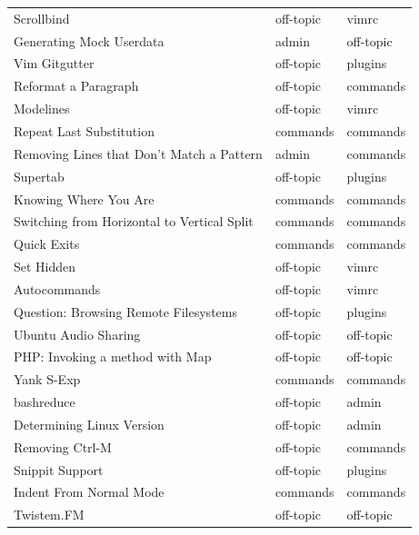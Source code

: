 \documentclass[12pt, a4paper]{article}
\begin{document}
\begin{longtable}{lll}
 Scrollbind                                  & off-topic   & vimrc     \\
 Generating Mock Userdata                    & admin       & off-topic \\
 Vim Gitgutter                               & off-topic   & plugins   \\
 Reformat a Paragraph                        & off-topic   & commands  \\
 Modelines                                   & off-topic   & vimrc     \\
 Repeat Last Substitution                    & commands    & commands  \\
 Removing Lines that Don't Match a Pattern   & admin       & commands  \\
 Supertab                                    & off-topic   & plugins   \\
 Knowing Where You Are                       & commands    & commands  \\
 Switching from Horizontal to Vertical Split & commands    & commands  \\
 Quick Exits                                 & commands    & commands  \\
 Set  Hidden                                 & off-topic   & vimrc     \\
 Autocommands                                & off-topic   & vimrc     \\
 Question: Browsing Remote Filesystems       & off-topic   & plugins   \\
 Ubuntu Audio Sharing                        & off-topic   & off-topic \\
 PHP: Invoking a method with Map             & off-topic   & off-topic \\
 Yank S-Exp                                  & commands    & commands  \\
 bashreduce                                  & off-topic   & admin     \\
 Determining Linux Version                   & off-topic   & admin     \\
 Removing Ctrl-M                             & off-topic   & commands  \\
 Snippit Support                             & off-topic   & plugins   \\
 Indent From Normal Mode                     & commands    & commands  \\
 Twistem.FM                                  & off-topic   & off-topic \\

\end{longtable}
\end{document}
